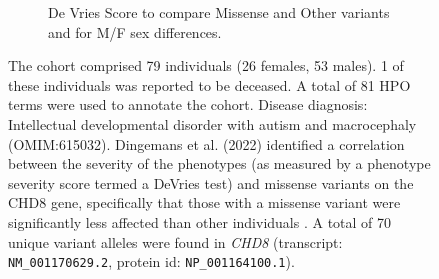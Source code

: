 
\begin{figure}[htbp]\ContinuedFloat
\begin{subfigure}[b]{0.95\textwidth}
\captionsetup{justification=raggedright,singlelinecheck=false}
\caption{De Vries Score to compare Missense and Other variants and for M/F sex differences. }
\end{subfigure}


\vspace{2em}

\caption{ The cohort comprised 79 individuals (26 females, 53 males). 1 of these individuals was reported to be deceased. 
A total of 81 HPO terms were used to annotate the cohort. Disease diagnosis: Intellectual developmental disorder with autism and macrocephaly 
(OMIM:615032).  Dingemans et al. (2022) identified a correlation between the severity of the phenotypes (as measured by a phenotype severity score termed a DeVries test) and missense variants on the CHD8 gene, 
specifically that those with a missense variant were significantly less affected than other individuals \cite{PMID_36182950}.
A total of 70 unique variant alleles were found in \textit{CHD8} (transcript: \texttt{NM\_001170629.2}, protein id: \texttt{NP\_001164100.1}).}
\end{figure}
